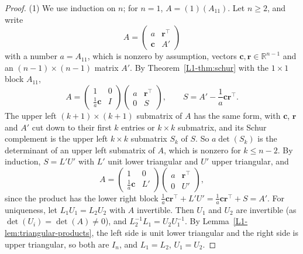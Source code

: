 \begin{proof}
    (1) We use induction on $n$; for $n = 1$, $A = (1)(A_{11})$. Let $n \geq 2$, and write
    \[A = \begin{pmatrix} a & \mathbf{r}^\top \\ \mathbf{c} & A' \end{pmatrix}\]
    with a number $a = A_{11}$, which is nonzero by assumption, vectors $\mathbf{c}, \mathbf{r} \in \mathbb{R}^{n-1}$ and an $(n - 1) \times (n - 1)$ matrix $A'$. By Theorem~\ref{L1-thm:schur} with the $1 \times 1$ block $A_{11}$,
    \[A = \begin{pmatrix} 1 & 0 \\ \frac{1}{a}\mathbf{c} & I \end{pmatrix}\begin{pmatrix} a & \mathbf{r}^\top \\ 0 & S \end{pmatrix}, \qquad S = A' - \frac{1}{a}\mathbf{c}\mathbf{r}^\top.\]
    The upper left $(k + 1) \times (k + 1)$ submatrix of $A$ has the same form, with $\mathbf{c}$, $\mathbf{r}$ and $A'$ cut down to their first $k$ entries or $k \times k$ submatrix, and its Schur complement is the upper left $k \times k$ submatrix $S_k$ of $S$. So $a\det(S_k)$ is the determinant of an upper left submatrix of $A$, which is nonzero for $k \leq n - 2$. By induction, $S = L'U'$ with $L'$ unit lower triangular and $U'$ upper triangular, and
    \[A = \begin{pmatrix} 1 & 0 \\ \frac{1}{a}\mathbf{c} & L' \end{pmatrix}\begin{pmatrix} a & \mathbf{r}^\top \\ 0 & U' \end{pmatrix},\]
    since the product has the lower right block $\frac{1}{a}\mathbf{c}\mathbf{r}^\top + L'U' = \frac{1}{a}\mathbf{c}\mathbf{r}^\top + S = A'$. For uniqueness, let $L_1U_1 = L_2U_2$ with $A$ invertible. Then $U_1$ and $U_2$ are invertible (as $\det(U_i) = \det(A) \neq 0$), and $L_2^{-1}L_1 = U_2U_1^{-1}$. By Lemma~\ref{L1-lem:triangular-products}, the left side is unit lower triangular and the right side is upper triangular, so both are $I_n$, and $L_1 = L_2$, $U_1 = U_2$.


\end{proof}

